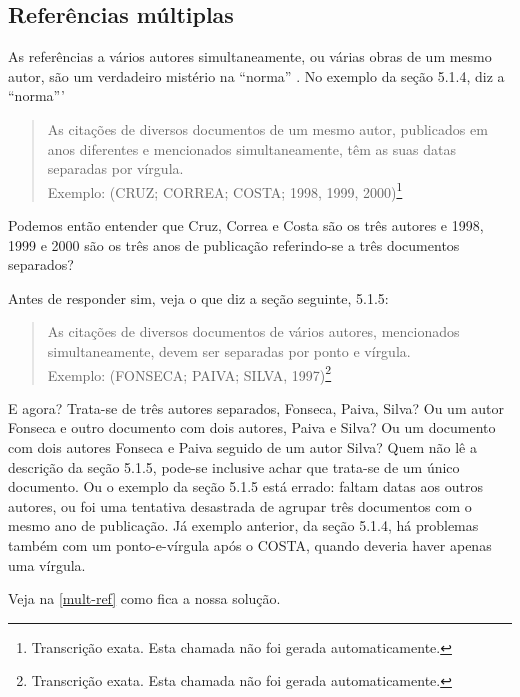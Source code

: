\documentclass[a4paper]{ltxdoc}
\begin{document}
\subsection{Referências múltiplas}

As referências a vários autores simultaneamente, ou várias obras de um mesmo
autor, são um verdadeiro mistério na ``norma'' \cite{NBR10520:2001}. No exemplo
da seção 5.1.4, diz a ``norma'''

\begin{quote}
As citações de diversos documentos de um mesmo autor, publicados em anos diferentes
e mencionados simultaneamente, têm as suas datas separadas por vírgula.\\
Exemplo: (CRUZ; CORREA; COSTA; 1998, 1999, 2000)\footnote{Transcrição exata. Esta
chamada não foi gerada automaticamente.}
\end{quote}

Podemos então entender que Cruz, Correa e Costa são os três autores e 1998, 1999
e 2000 são os três anos de publicação referindo-se a três documentos separados?

Antes de responder sim, veja o que diz a seção seguinte, 5.1.5:

\begin{quote}
As citações de diversos documentos de vários autores, mencionados simultaneamente,
devem ser separadas por ponto e vírgula.\\
Exemplo: (FONSECA; PAIVA; SILVA, 1997)\footnote{Transcrição exata. Esta
chamada não foi gerada automaticamente.}
\end{quote}

E agora? Trata-se de três autores separados, Fonseca, Paiva, Silva? Ou um
autor Fonseca e outro documento com dois autores, Paiva e Silva? Ou um
documento com dois autores Fonseca e Paiva seguido de um autor Silva?
Quem não lê a descrição da seção 5.1.5, pode-se inclusive achar que trata-se
de um único documento. Ou o exemplo da seção 5.1.5 está errado: faltam datas aos
outros autores, ou foi uma tentativa desastrada de agrupar três documentos com
o mesmo ano de publicação. Já exemplo anterior, da seção 5.1.4, há problemas
também com um ponto-e-vírgula após o COSTA, quando deveria haver apenas uma
vírgula. 

Veja na \autoref{mult-ref} como fica a nossa solução.
\end{document}
